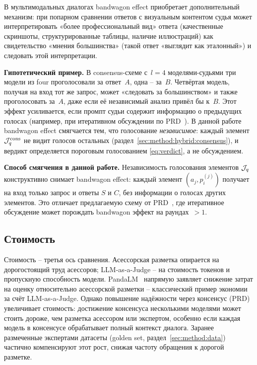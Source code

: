 В мультимодальных диалогах bandwagon effect приобретает
дополнительный механизм: при попарном сравнении ответов с
визуальным контентом судья может интерпретировать
«более профессиональный вид» ответа (качественные
скриншоты, структурированные таблицы, наличие
иллюстраций) как свидетельство «мнения большинства»
(такой ответ «выглядит как эталонный») и следовать этой
интерпретации.

\textbf{Гипотетический пример.}
В consensus-схеме с~$l = 4$ моделями-судьями три модели из
 four проголосовали за ответ~$A$, одна -- за~$B$.
 Четвёртая модель, получая на вход тот же запрос, может
 «следовать за большинством» и также проголосовать за~$A$,
 даже если её независимый анализ привёл бы к~$B$.
 Этот эффект усиливается, если промпт судьи содержит
 информацию о предыдущих голосах (например, при
 итеративном обсуждении по PRD~\cite{li2023prd}).
 В данной работе bandwagon effect смягчается тем, что
 голосование \emph{независимое}: каждый элемент
 $\mathcal{J}_q^{\mathrm{cons}}$ не видит голосов остальных
 (раздел~\ref{sec:method:hybrid:consensus}), и вердикт
 определяется пороговым голосованием
 \eqref{eq:verdict}, а не обсуждением.

\textbf{Способ смягчения в данной работе.}
Независимость голосования элементов $\mathcal{J}_q$
конструктивно снимает bandwagon effect: каждый элемент
$(a_j, p_i^{(j)})$ получает на вход только запрос и ответы
$S$ и $C$, без информации о голосах других элементов.
Это отличает предлагаемую схему от PRD~\cite{li2023prd},
где итеративное обсуждение может порождать bandwagon
эффект на раундах~$> 1$.

\subsection{Стоимость}

Стоимость -- третья ось сравнения.
Асессорская разметка опирается на дорогостоящий труд асессоров;
LLM-as-a-Judge -- на стоимость токенов и пропускную способность модели.
PandaLM~\cite{wang2023pandalm} напрямую заявляет снижение затрат на
оценку относительно асессорской разметки -- классический пример
экономии за счёт LLM-as-a-Judge.
Однако повышение надёжности через консенсус (PRD) увеличивает
стоимость: достижение консенсуса несколькими моделями может стоить
дороже, чем разметка асессором или экспертом, особенно если каждая
модель в консенсусе обрабатывает полный контекст диалога.
Заранее размеченные экспертами датасеты (golden set,
раздел~\ref{sec:method:data}) частично компенсируют этот рост,
снижая частоту обращения к дорогой разметке.

